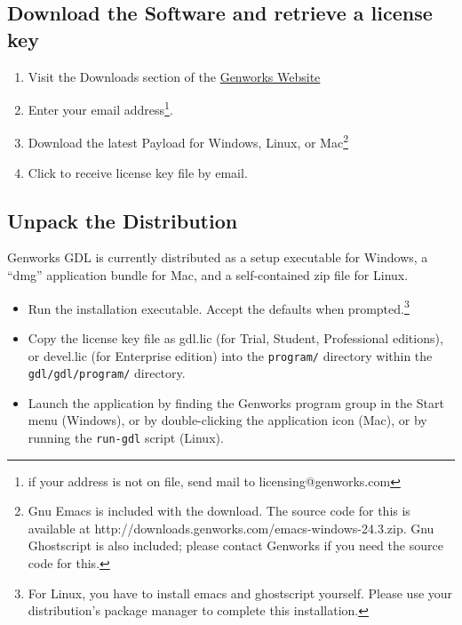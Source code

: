 \documentclass [11pt]{book}
\begin{document}
\subsection{Download the Software and retrieve a license key}

\label{subsec:downloadthesoftwareandretrievealicensekey}



\begin{enumerate}

\item Visit the Downloads section of the \href{http://genworks.com}{Genworks Website}

\item Enter your email address\footnote{if your address is not on file, send mail to licensing@genworks.com}.

\item Download the latest Payload for Windows, Linux, or Mac\footnote{Gnu Emacs is included with the download. The source code for this 
is available at http://downloads.genworks.com/emacs-windows-24.3.zip. Gnu Ghostscript
is also included; please contact Genworks if you need the source code for this.}

\item Click to receive license key file by email.

\end{enumerate}



\subsection{Unpack the Distribution}

\label{subsec:unpackthedistribution}

Genworks GDL is currently distributed as a setup executable for Windows,
a ``dmg'' application bundle for Mac, and a self-contained zip file for Linux.

\begin{itemize}

\item Run the installation executable. Accept the defaults when prompted.\footnote{For Linux, you have to install emacs and ghostscript yourself. Please use your distribution's package manager to complete this installation.}

\item Copy the license key file as gdl.lic (for Trial,
	 Student, Professional editions), or devel.lic (for Enterprise edition) into the \texttt{program/} directory within the 
\texttt{gdl/gdl/program/} directory.

\item Launch the application by finding the Genworks program group in the Start menu (Windows), or by double-clicking the application icon (Mac), or by running the \texttt{run-gdl} script (Linux).

\end{itemize}
\end{document}

